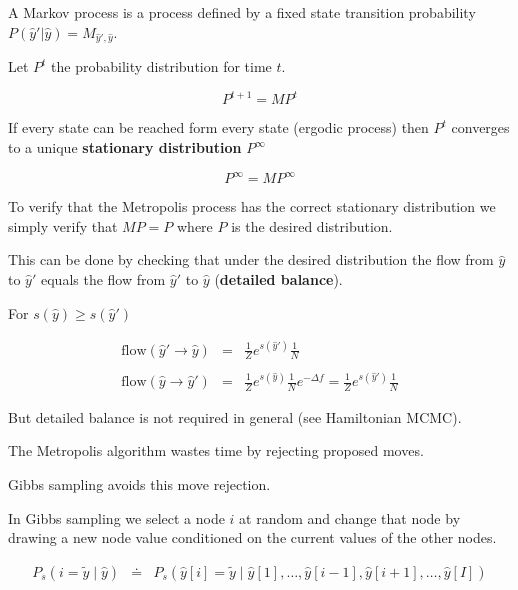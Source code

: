{A Markov process is a process defined by a fixed state transition probability $P(\hat{y}'|\hat{y}) = M_{\hat{y}',\hat{y}}$.

\vfill
Let $P^t$ the probability distribution for time $t$.

\vfill
$$P^{t+1} = MP^t$$

\vfill
If every state can be reached form every state (ergodic process) then $P^t$ converges to a unique {\bf stationary distribution} $P^\infty$

\vfill
$$P^\infty = MP^\infty$$


To verify that the Metropolis process has the correct stationary distribution we simply verify that $MP = P$ where $P$
is the desired distribution.

\vfill
This can be done by checking that under the desired distribution the flow from $\hat{y}$ to $\hat{y}'$
equals the flow from $\hat{y}'$ to $\hat{y}$ ({\bf detailed balance}).


For $s(\hat{y}) \geq s(\hat{y}')$

\vfill
\begin{eqnarray*}
  \mathrm{flow}(\hat{y}' \rightarrow \hat{y}) &  = & \frac{1}{Z}e^{s(\hat{y}')} \frac{1}{N} \\
  \\
\mathrm{flow}(\hat{y} \rightarrow \hat{y}') & = & \frac{1}{Z}e^{s(\hat{y})} \frac{1}{N} e^{-\Delta f} = \frac{1}{Z} e^{s(\hat{y}')} \frac{1}{N}
\end{eqnarray*}

\vfill
But detailed balance is not required in general (see Hamiltonian MCMC).


The Metropolis algorithm wastes time by rejecting proposed moves.

\vfill
Gibbs sampling avoids this move rejection.

\vfill
In Gibbs sampling we select a node $i$ at random and change that node by drawing a new node value conditioned on the current values of the other nodes.


\begin{eqnarray*}
  P_s(i=\tilde{y} \;|\;\hat{y}) & \doteq & P_s(\hat{y}[i] = \tilde{y}\;|\;\hat{y}[1],\ldots,\hat{y}[i-1],\hat{y}[i+1],\ldots,\hat{y}[I])
\end{eqnarray*}

}
